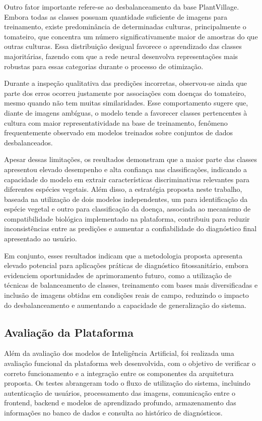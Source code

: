 \documentclass[portuguese]{sbc2025}%
\begin{document}
Outro fator importante refere-se ao desbalanceamento da base PlantVillage. Embora todas as classes possuam quantidade suficiente de 
imagens para treinamento, existe predominância de determinadas culturas, principalmente o tomateiro, que concentra um número 
significativamente maior de amostras do que outras culturas. Essa distribuição desigual favorece o aprendizado das classes majoritárias,
fazendo com que a rede neural desenvolva representações mais robustas para essas categorias durante o processo de otimização.

Durante a inspeção qualitativa das predições incorretas, observou-se ainda que parte dos erros ocorreu justamente por associações com
doenças do tomateiro, mesmo quando não tem muitas similaridades. Esse comportamento sugere que, diante de imagens ambíguas, o modelo 
tende a favorecer classes pertencentes à cultura com maior representatividade na base de treinamento, fenômeno frequentemente observado 
em modelos treinados sobre conjuntos de dados desbalanceados.

Apesar dessas limitações, os resultados demonstram que a maior parte das classes apresentou elevado desempenho e alta confiança nas 
classificações, indicando a capacidade do modelo em extrair características discriminativas relevantes para diferentes espécies 
vegetais. Além disso, a estratégia proposta neste trabalho, baseada na utilização de dois modelos independentes, um para identificação
da espécie vegetal e outro para classificação da doença, associada ao mecanismo de compatibilidade biológica implementado na 
plataforma, contribuiu para reduzir inconsistências entre as predições e aumentar a confiabilidade do diagnóstico final apresentado 
ao usuário.

Em conjunto, esses resultados indicam que a metodologia proposta apresenta elevado potencial para aplicações práticas de diagnóstico 
fitossanitário, embora evidenciem oportunidades de aprimoramento futuro, como a utilização de técnicas de balanceamento de classes, 
treinamento com bases mais diversificadas e inclusão de imagens obtidas em condições reais de campo, reduzindo o impacto do 
desbalanceamento e aumentando a capacidade de generalização do sistema.

\subsection{Avaliação da Plataforma}

Além da avaliação dos modelos de Inteligência Artificial, foi realizada uma avaliação funcional da plataforma web desenvolvida, com o 
objetivo de verificar o correto funcionamento e a integração entre os componentes da arquitetura proposta. Os testes abrangeram todo 
o fluxo de utilização do sistema, incluindo autenticação de usuários, processamento das imagens, comunicação entre o frontend, 
backend e modelos de aprendizado profundo, armazenamento das informações no banco de dados e consulta ao histórico de diagnósticos.
\end{document}
